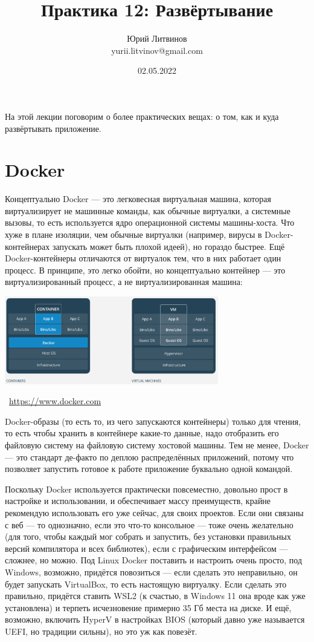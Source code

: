 \documentclass[a5paper]{article}
\title{Практика 12: Развёртывание}
\author{Юрий Литвинов\\\small{yurii.litvinov@gmail.com}}
\date{02.05.2022}
\newcommand{\attribution}[1] {
    \vspace{-5mm}\begin{flushright}\begin{scriptsize}\textcolor{gray}{\textcopyright\, #1}\end{scriptsize}\end{flushright}
}
\begin{document}
\maketitle
\thispagestyle{empty}

На этой лекции поговорим о более практических вещах: о том, как и куда развёртывать приложение.

\section{Docker}

Концептуально Docker --- это легковесная виртуальная машина, которая виртуализирует не машинные команды, как обычные виртуалки, а системные вызовы, то есть используется ядро операционной системы машины-хоста. Что хуже в плане изоляции, чем обычные виртуалки (например, вирусы в Docker-контейнерах запускать может быть плохой идеей), но гораздо быстрее. Ещё Docker-контейнеры отличаются от виртуалок тем, что в них работает один процесс. В принципе, это легко обойти, но концептуально контейнер --- это виртуализированный процесс, а не виртуализированная машина:

\begin{center}
    \includegraphics[width=0.7\textwidth]{docker.png}
    \attribution{\url{ https://www.docker.com}}
\end{center}

Docker-образы (то есть то, из чего запускаются контейнеры) только для чтения, то есть чтобы хранить в контейнере какие-то данные, надо отобразить его файловую систему на файловую систему хостовой машины. Тем не менее, Docker --- это стандарт де-факто по деплою распределённых приложений, потому что позволяет запустить готовое к работе приложение буквально одной командой. 

Поскольку Docker используется практически повсеместно, довольно прост в настройке и использовании, и обеспечивает массу преимуществ, крайне рекомендую использовать его уже сейчас, для своих проектов. Если они связаны с веб --- то однозначно, если это что-то консольное --- тоже очень желательно (для того, чтобы каждый мог собрать и запустить, без установки правильных версий компилятора и всех библиотек), если с графическим интерфейсом --- сложнее, но можно. Под Linux Docker поставить и настроить очень просто, под Windows, возможно, придётся повозиться --- если сделать это неправильно, он будет запускать VirtualBox, то есть настоящую виртуалку. Если сделать это правильно, придётся ставить WSL2 (к счастью, в Windows 11 она вроде как уже установлена) и терпеть исчезновение примерно 35 Гб места на диске. И ещё, возможно, включить HyperV в настройках BIOS (который давно уже называется UEFI, но традиции сильны), но это уж как повезёт.
\end{document}
